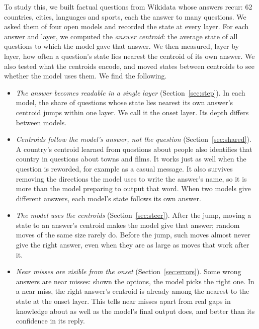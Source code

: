 To study this, we built \NFacts{} factual questions from Wikidata whose answers recur: 62 countries, cities, languages and sports, each the answer to many questions. We asked them of four open models and recorded the state at every layer. For each answer and layer, we computed the \emph{answer centroid}: the average state of all questions to which the model gave that answer. We then measured, layer by layer, how often a question's state lies nearest the centroid of its own answer. We also tested what the centroids encode, and moved states between centroids to see whether the model uses them. We find the following.
\begin{itemize}\itemsep2pt
\item \emph{The answer becomes readable in a single layer} (Section~\ref{sec:step}). In each model, the share of questions whose state lies nearest its own answer's centroid jumps within one layer. We call it the onset layer. Its depth differs between models.
\item \emph{Centroids follow the model's answer, not the question} (Section~\ref{sec:shared}). A country's centroid learned from questions about people also identifies that country in questions about towns and films. It works just as well when the question is reworded, for example as a casual message. It also survives removing the directions the model uses to write the answer's name, so it is more than the model preparing to output that word. When two models give different answers, each model's state follows its own answer.
\item \emph{The model uses the centroids} (Section~\ref{sec:steer}). After the jump, moving a state to an answer's centroid makes the model give that answer; random moves of the same size rarely do. Before the jump, such moves almost never give the right answer, even when they are as large as moves that work after it.
\item \emph{Near misses are visible from the onset} (Section~\ref{sec:errors}). Some wrong answers are near misses: shown the options, the model picks the right one. In a near miss, the right answer's centroid is already among the nearest to the state at the onset layer. This tells near misses apart from real gaps in knowledge about as well as the model's final output does, and better than its confidence in its reply.
\end{itemize}

